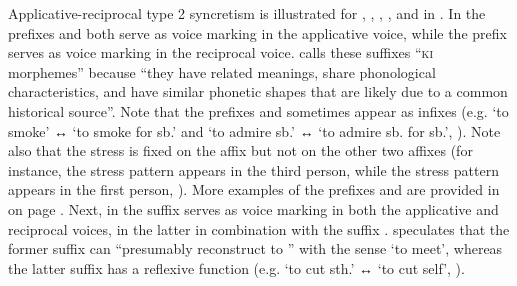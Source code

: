 Applicative-reciprocal type 2 syncretism is illustrated for , , , , and  in . In  the prefixes  and  both serve as voice marking in the applicative voice, while the prefix  serves as voice marking in the reciprocal voice. \citet[258]{cumberland:2005} calls these suffixes “\textsc{ki} morphemes” because “they have related meanings, share phonological characteristics, and have similar phonetic shapes that are likely due to a common historical source”. Note that the prefixes  and  sometimes appear as infixes (e.g.  ‘to smoke’ ↔  ‘to smoke for sb.’ and  ‘to admire sb.’ ↔  ‘to admire sb. for sb.’, \citealt[263ff.]{cumberland:2005}). Note also that the stress is fixed on the affix  but not on the other two affixes (for instance, the stress pattern  appears in the third person, while the stress pattern  appears in the first person, \citealt[270]{cumberland:2005}). More examples of the prefixes  and  are provided in  on page \pageref{tab:ch3:type2-examples}. Next, in  the suffix  serves as voice marking in both the applicative and reciprocal voices, in the latter in combination with the suffix . \citet[530f.]{post:2007} speculates that the former suffix  can “presumably reconstruct to ” with the sense ‘to meet’, whereas the latter suffix has a reflexive function (e.g.  ‘to cut sth.’ ↔  ‘to cut self’, \citealt[137, 541]{post:2007}). 

